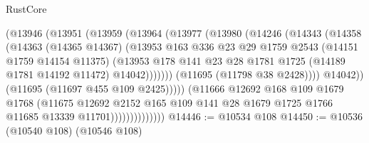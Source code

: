 \begin{lexlean}{RustCore}
\begin{coremodule}
                                (@13946
                                  (@13951
                                    (@13959
                                      (@13964
                                        (@13977
                                          (@13980
                                            (@14246
                                              (@14343
                                                (@14358
                                                  (@14363
                                                    (@14365 @14367)
                                                    (@13953
                                                      @163
                                                      @336
                                                      @23
                                                      @29
                                                      @1759
                                                      @2543
                                                      (@14151 @1759 @14154 @11375)
                                                      (@13953
                                                        @178
                                                        @141
                                                        @23
                                                        @28
                                                        @1781
                                                        @1725
                                                        (@14189 @1781 @14192 @11472)
                                                        @14042)))))))
                                          (@11695 (@11798 @38 @2428))))
                                      @14042))
                                  (@11695 (@11697 @455 @109 @2425)))))
                            (@11666
                              @12692
                              @168
                              @109
                              @1679
                              @1768
                              (@11675
                                @12692
                                @2152
                                @165
                                @109
                                @141
                                @28
                                @1679
                                @1725
                                @1766
                                @11685
                                @13339
                                @11701))))))))))))))
@14446 := @10534 @108
@14450 := @10536 (@10540 @108) (@10546 @108)

\end{coremodule}
\end{lexlean}

